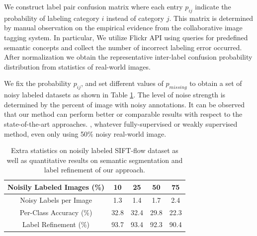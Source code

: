 We construct label pair confusion matrix where each entry $p_{ij}$ indicate the probability of labeling category $i$ instead of category $j$. This matrix is determined by manual observation on the empirical evidence from the collaborative image tagging system. In particular, We utilize Flickr API using queries for predefined semantic concepts and collect the number of incorrect labeling error occurred. After normalization we obtain the representative inter-label confusion probability distribution from statistics of real-world images.

We fix the probability $p_{ij}$, and set different values of $p_{missing}$ to obtain a set of noisy labeled datasets as shown in Table \ref{tab:ExpNoise}. The level of noise strength is determined by the percent of image with noisy annotations. It can be observed that our method can perform better or comparable results with respect to the state-of-the-art approaches.
\if
, whatever fully-supervised or weakly supervised method, even only using 50\% noisy real-world image.
\fi

\begin{table}[htb]
\begin{center}
\begin{tabular}{|c|c|c|c|c|}
\hline
Noisily Labeled Images (\%) & 10 & 25 & 50 & 75 \\
\hline
Noisy Labels per Image & 1.3 & 1.4 & 1.7 & 2.4 \\
\hline
Per-Class Accuracy (\%) & 32.8 & 32.4 & 29.8 & 22.3 \\
\hline
Label Refinement (\%) & 93.7 & 93.4 & 92.3 & 90.4 \\
\hline
\end{tabular}
\end{center}
\caption{Extra statistics on noisily labeled SIFT-flow dataset as well as quantitative results on semantic segmentation and label refinement of our approach.}
\label{tab:ExpNoise}
\end{table}

